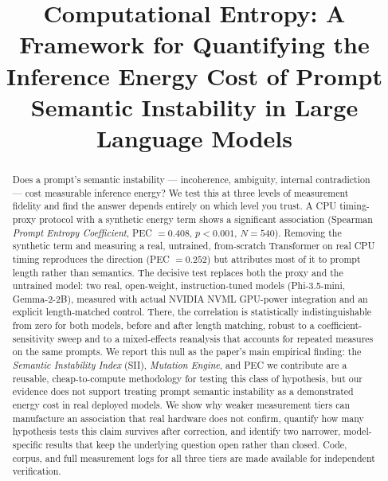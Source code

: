 \documentclass[conference]{IEEEtran}
\begin{document}
\title{Computational Entropy: A Framework for Quantifying the Inference
Energy Cost of Prompt Semantic Instability in Large Language Models}
\author{
  \and
}
\maketitle
\begin{abstract}
Does a prompt's semantic instability --- incoherence, ambiguity,
internal contradiction --- cost measurable inference energy? We test
this at three levels of measurement fidelity and find the answer
depends entirely on which level you trust. A CPU timing-proxy protocol
with a synthetic energy term shows a significant association (Spearman
\emph{Prompt Entropy Coefficient}, PEC $=0.408$, $p<0.001$, $N=540$).
Removing the synthetic term and measuring a real, untrained,
from-scratch Transformer on real CPU timing reproduces the direction
(PEC $=0.252$) but attributes most of it to prompt length rather than
semantics. The decisive test replaces both the proxy and the untrained
model: two real, open-weight, instruction-tuned models (Phi-3.5-mini,
Gemma-2-2B), measured with actual NVIDIA NVML GPU-power integration and
an explicit length-matched control. There, the correlation is
statistically indistinguishable from zero for both models, before and
after length matching, robust to a coefficient-sensitivity sweep and
to a mixed-effects reanalysis that accounts for repeated measures on
the same prompts. We report this null as the paper's main empirical
finding: the \emph{Semantic Instability Index} (SII), \emph{Mutation
Engine}, and PEC we contribute are a reusable, cheap-to-compute
methodology for testing this class of hypothesis, but our evidence
does not support treating prompt semantic instability as a
demonstrated energy cost in real deployed models. We show why weaker
measurement tiers can manufacture an association that real hardware
does not confirm, quantify how many hypothesis tests this claim
survives after correction, and identify two narrower, model-specific
results that keep the underlying question open rather than closed.
Code, corpus, and full measurement logs for all three tiers are made
available for independent verification.
\end{abstract}
\end{document}
